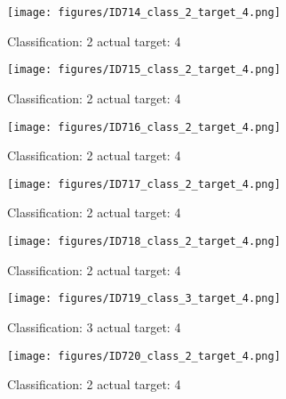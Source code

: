 \begin{figure}[h!]
\begin{center}
\texttt{[image: figures/ID714\_class\_2\_target\_4.png]}
\end{center}
\caption{ Classification: 2 actual target: 4}
\label{fig:ID714_class_2_target_4}
\end{figure}
\begin{figure}[h!]
\begin{center}
\texttt{[image: figures/ID715\_class\_2\_target\_4.png]}
\end{center}
\caption{ Classification: 2 actual target: 4}
\label{fig:ID715_class_2_target_4}
\end{figure}
\begin{figure}[h!]
\begin{center}
\texttt{[image: figures/ID716\_class\_2\_target\_4.png]}
\end{center}
\caption{ Classification: 2 actual target: 4}
\label{fig:ID716_class_2_target_4}
\end{figure}
\begin{figure}[h!]
\begin{center}
\texttt{[image: figures/ID717\_class\_2\_target\_4.png]}
\end{center}
\caption{ Classification: 2 actual target: 4}
\label{fig:ID717_class_2_target_4}
\end{figure}
\begin{figure}[h!]
\begin{center}
\texttt{[image: figures/ID718\_class\_2\_target\_4.png]}
\end{center}
\caption{ Classification: 2 actual target: 4}
\label{fig:ID718_class_2_target_4}
\end{figure}
\begin{figure}[h!]
\begin{center}
\texttt{[image: figures/ID719\_class\_3\_target\_4.png]}
\end{center}
\caption{ Classification: 3 actual target: 4}
\label{fig:ID719_class_3_target_4}
\end{figure}
\begin{figure}[h!]
\begin{center}
\texttt{[image: figures/ID720\_class\_2\_target\_4.png]}
\end{center}
\caption{ Classification: 2 actual target: 4}
\label{fig:ID720_class_2_target_4}
\end{figure}
